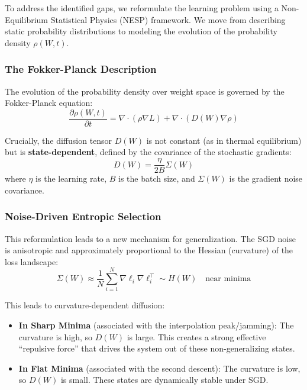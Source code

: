 To address the identified gaps, we reformulate the learning problem using a Non-Equilibrium Statistical Physics (NESP) framework. We move from describing static probability distributions to modeling the evolution of the probability density $\rho(W,t)$.

\subsubsection{The Fokker-Planck Description}

The evolution of the probability density over weight space is governed by the Fokker-Planck equation:
\begin{equation}
    \frac{\partial \rho(W, t)}{\partial t} = \nabla \cdot \left(\rho \nabla L\right) + \nabla \cdot \left(D(W) \nabla \rho\right)
\end{equation}

Crucially, the diffusion tensor $D(W)$ is not constant (as in thermal equilibrium) but is \textbf{state-dependent}, defined by the covariance of the stochastic gradients:
\begin{equation}
    D(W) = \frac{\eta}{2B} \Sigma(W)
\end{equation}
where $\eta$ is the learning rate, $B$ is the batch size, and $\Sigma(W)$ is the gradient noise covariance.

\subsubsection{Noise-Driven Entropic Selection}

This reformulation leads to a new mechanism for generalization. The SGD noise is anisotropic and approximately proportional to the Hessian (curvature) of the loss landscape:
\begin{equation}
    \Sigma(W) \approx \frac{1}{N} \sum_{i=1}^N \nabla \ell_i \nabla \ell_i^\top \sim H(W) \quad \text{near minima}
\end{equation}

This leads to curvature-dependent diffusion:
\begin{itemize}[topsep=1pt,itemsep=1pt]
    \item \textbf{In Sharp Minima} (associated with the interpolation peak/jamming): The curvature is high, so $D(W)$ is large. This creates a strong effective ``repulsive force'' that drives the system out of these non-generalizing states.
    
    \item \textbf{In Flat Minima} (associated with the second descent): The curvature is low, so $D(W)$ is small. These states are dynamically stable under SGD.
\end{itemize}

